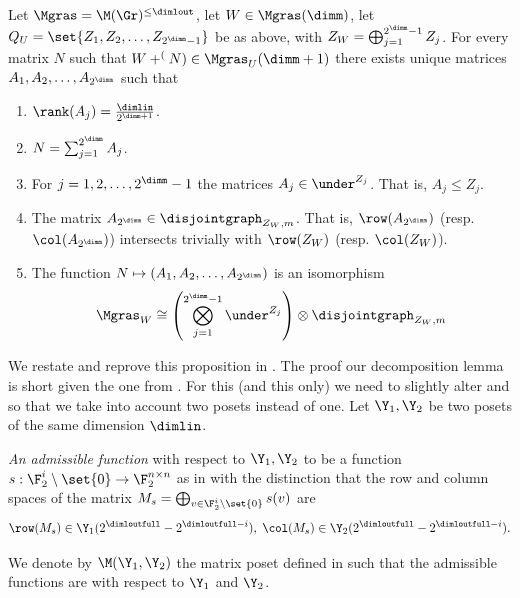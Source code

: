 \begin{proposition} \label{prop:louis-decomposition}
    Let \(\Mgras = \M(\Gr)^{\leq \dimlout}\), let \(W \in \Mgras(\dimm)\), let \(Q_U = \set{Z_1,Z_2,\dots,Z_{2^{\dimm}-1}}\) be as above, with \(Z_W = \bigoplus_{j=1}^{2^\dimm -1} Z_j\). For every matrix \(N\) such that \(W + \sp(N) \in \Mgras_U(\dimm+1)\) there exists unique matrices \(A_1,A_2,\dots,A_{2^{\dimm}}\) such that
    \begin{enumerate}
            \item \(\rank(A_j) = \frac{\dimlin}{2^{\dimm+1}}\).
            \item \(N = \sum_{j=1}^{2^\dimm} A_{j}\).
            \item For \(j=1,2,\dots,2^\dimm-1\) the matrices \(A_j \in \under^{Z_j}\). That is, \(A_j \leq Z_j\).
            \item The matrix \(A_{2^{\dimm}} \in \disjointgraph_{Z_W,m}\). That is, \(\row(A_{2^\dimm})\) (resp. \(\col(A_{2^\dimm})\)) intersects trivially with \(\row(Z_W)\) (resp. \(\col(Z_W)\)).
            \item The function \(N \mapsto (A_1,A_2,\dots,A_{2^\dimm})\) is an isomorphism 
            \[\Mgras_W \cong \left ( \bigotimes_{j=1}^{2^\dimm -1} \under^{Z_j} \right ) \otimes \disjointgraph_{Z_W,m}\]
    \end{enumerate}
\end{proposition}

We restate and reprove this proposition in . The proof our decomposition lemma is short given the one from \cite{Golowich2023}. For this (and this only) we need to slightly alter  and  so that we take into account two posets instead of one. Let \(\Y_1,\Y_2\) be two posets of the same dimension \(\dimlin\).
\begin{definition}
    \emph{An admissible function} with respect to \(\Y_1,\Y_2\) to be a function \(s: \F_2^i \setminus \set{0} \to \F_2^{n \times n}\) as in  with the distinction that the row and column spaces of the matrix \(M_s = \bigoplus_{v \in \F_2^i \setminus \set{0}}s(v)\) are 
    \[\row(M_s) \in \Y_1(2^{\dimloutfull} - 2^{\dimloutfull - i}), \;\col(M_s) \in \Y_2(2^{\dimloutfull} - 2^{\dimloutfull - i}).\]
\end{definition}
\begin{definition}
    We denote by \(\M(\Y_1,\Y_2)\) the matrix poset defined in  such that the admissible functions are with respect to \(\Y_1\) and \(\Y_2\).
\end{definition}

